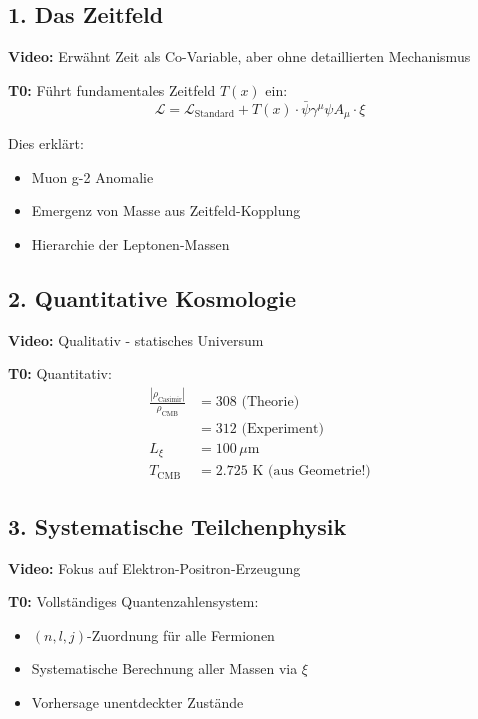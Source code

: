 \documentclass[12pt,a4paper]{article}
\newcommand{\xipar}{\xi}
\begin{document}
	\subsection{1. Das Zeitfeld}
	
	\textbf{Video:} Erwähnt Zeit als Co-Variable, aber ohne detaillierten Mechanismus
	
	\textbf{T0:} Führt fundamentales Zeitfeld $T(x)$ ein:
	\begin{equation}
		\mathcal{L} = \mathcal{L}_{\text{Standard}} + T(x) \cdot \bar{\psi}\gamma^\mu\psi A_\mu \cdot \xipar
	\end{equation}
	
	Dies erklärt:
	\begin{itemize}
		\item Muon g-2 Anomalie
		\item Emergenz von Masse aus Zeitfeld-Kopplung
		\item Hierarchie der Leptonen-Massen
	\end{itemize}
	
	\subsection{2. Quantitative Kosmologie}
	
	\textbf{Video:} Qualitativ - statisches Universum
	
	\textbf{T0:} Quantitativ:
	\begin{align}
		\frac{|\rho_{\text{Casimir}}|}{\rho_{\text{CMB}}} &= 308 \text{ (Theorie)} \\
		&= 312 \text{ (Experiment)} \\
		L_\xi &= 100 \, \mu\text{m} \\
		T_{\text{CMB}} &= 2.725 \text{ K (aus Geometrie!)}
	\end{align}
	
	\subsection{3. Systematische Teilchenphysik}
	
	\textbf{Video:} Fokus auf Elektron-Positron-Erzeugung
	
	\textbf{T0:} Vollständiges Quantenzahlensystem:
	\begin{itemize}
		\item $(n,l,j)$-Zuordnung für alle Fermionen
		\item Systematische Berechnung aller Massen via $\xipar$
		\item Vorhersage unentdeckter Zustände
	\end{itemize}
	
\end{document}
